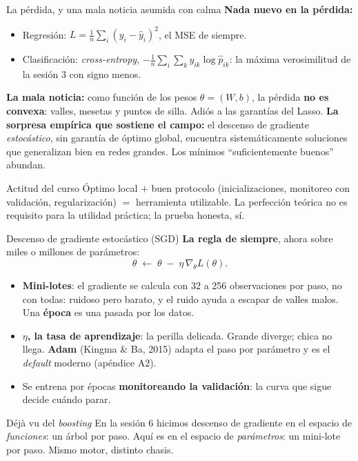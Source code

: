 \documentclass{beamer}
\newcommand{\1}{\mathbb{I}}
\begin{document}
\begin{frame}{La pérdida, y una mala noticia asumida con calma}
\small
\textbf{Nada nuevo en la pérdida:}
\begin{itemize}\itemsep2pt
  \item Regresión: $L = \frac{1}{n}\sum_i (y_i - \hat{y}_i)^2$, el MSE de siempre.
  \item Clasificación: \emph{cross-entropy}, $-\frac{1}{n}\sum_i \sum_k y_{ik} \log \hat{p}_{ik}$: la máxima verosimilitud de la sesión 3 con signo menos.
\end{itemize}
\pause
\vspace{0.1cm}
\textbf{La mala noticia:} como función de los pesos $\theta = (W, b)$, la pérdida \textbf{no es convexa}: valles, mesetas y puntos de silla. Adiós a las garantías del Lasso.
\pause
\vspace{0.1cm}
\textbf{La sorpresa empírica que sostiene el campo:} el descenso de gradiente \emph{estocástico}, sin garantía de óptimo global, encuentra sistemáticamente soluciones que generalizan bien en redes grandes. Los mínimos ``suficientemente buenos'' abundan.
\pause
\vspace{0.1cm}
\begin{block}{Actitud del curso}
Óptimo local $+$ buen protocolo (inicializaciones, monitoreo con validación, regularización) $=$ herramienta utilizable. La perfección teórica no es requisito para la utilidad práctica; la prueba honesta, sí.
\end{block}
\end{frame}

\begin{frame}{Descenso de gradiente estocástico (SGD)}
\small
\textbf{La regla de siempre}, ahora sobre miles o millones de parámetros:
\[ \theta \;\leftarrow\; \theta \;-\; \eta \, \nabla_\theta L(\theta). \]
\pause
\begin{itemize}\itemsep3pt
  \item \textbf{Mini-lotes}: el gradiente se calcula con 32 a 256 observaciones por paso, no con todas: ruidoso pero barato, y el ruido ayuda a escapar de valles malos. Una \textbf{época} es una pasada por los datos.
  \item \textbf{$\eta$, la tasa de aprendizaje}: la perilla delicada. Grande diverge; chica no llega. \textbf{Adam} (Kingma \& Ba, 2015) adapta el paso por parámetro y es el \emph{default} moderno (apéndice A2).
  \item Se entrena por épocas \textbf{monitoreando la validación}: la curva que sigue decide cuándo parar.
\end{itemize}
\pause
\begin{block}{Déjà vu del \emph{boosting}}
En la sesión 6 hicimos descenso de gradiente en el espacio de \emph{funciones}: un árbol por paso. Aquí es en el espacio de \emph{parámetros}: un mini-lote por paso. Mismo motor, distinto chasis.
\end{block}
\end{frame}
\end{document}
